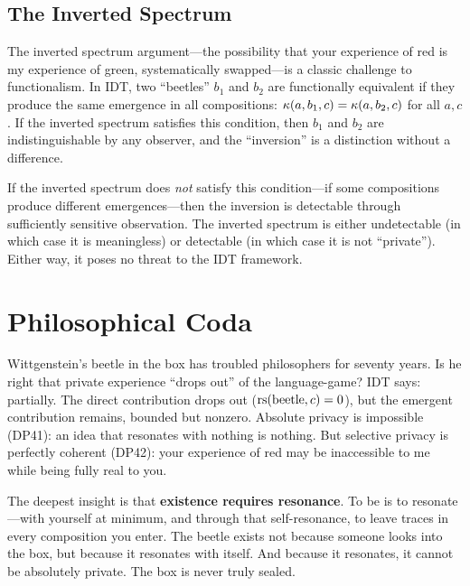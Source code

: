 \subsection{The Inverted Spectrum}

The inverted spectrum argument---the possibility that your experience of red
is my experience of green, systematically swapped---is a classic challenge to
functionalism.  In IDT, two ``beetles'' $b_1$ and $b_2$ are functionally
equivalent if they produce the same emergence in all compositions:
$\kappa(a, b_1, c) = \kappa(a, b_2, c)$ for all $a, c$.  If the inverted
spectrum satisfies this condition, then $b_1$ and $b_2$ are indistinguishable
by any observer, and the ``inversion'' is a distinction without a difference.

If the inverted spectrum does \emph{not} satisfy this condition---if some
compositions produce different emergences---then the inversion is detectable
through sufficiently sensitive observation.  The inverted spectrum is either
undetectable (in which case it is meaningless) or detectable (in which case it
is not ``private'').  Either way, it poses no threat to the IDT framework.

\section{Philosophical Coda}

Wittgenstein's beetle in the box has troubled philosophers for seventy years.
Is he right that private experience ``drops out'' of the language-game?  IDT
says: partially.  The direct contribution drops out ($\mathrm{rs}(\mathrm{beetle}, c)
= 0$), but the emergent contribution remains, bounded but nonzero.  Absolute
privacy is impossible (DP41): an idea that resonates with nothing is nothing.
But selective privacy is perfectly coherent (DP42): your experience of red may
be inaccessible to me while being fully real to you.

The deepest insight is that \textbf{existence requires resonance}.  To be is
to resonate---with yourself at minimum, and through that self-resonance, to
leave traces in every composition you enter.  The beetle exists not because
someone looks into the box, but because it resonates with itself.  And because
it resonates, it cannot be absolutely private.  The box is never truly sealed.



